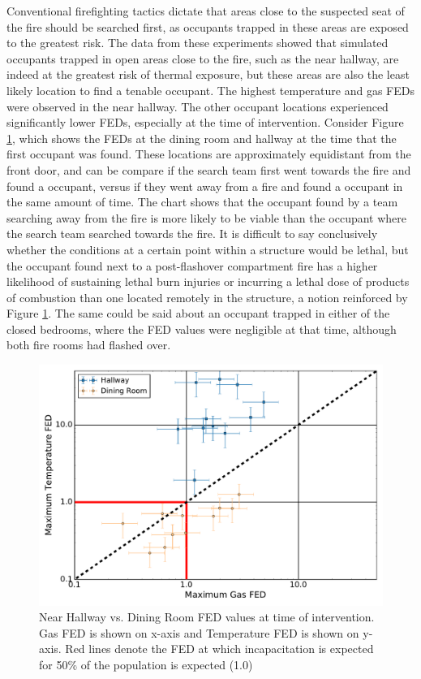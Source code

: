 \documentclass[12pt,oneside]{article}
\begin{document}
Conventional firefighting tactics \cite{Mittendorf,Norman} dictate that areas close to the suspected seat of the fire should be searched first, as occupants trapped in these areas are exposed to the greatest risk. The data from these experiments showed that simulated occupants trapped in open areas close to the fire, such as the near hallway, are indeed at the greatest risk of thermal exposure, but these areas are also the least likely location to find a tenable occupant. The highest temperature and gas FEDs were observed in the near hallway. The other occupant locations experienced significantly lower FEDs, especially at the time of intervention. Consider Figure \ref{fig:open_FED_compare}, which shows the FEDs at the dining room and hallway at the time that the first occupant was found. These locations are approximately equidistant from the front door, and can be compare if the search team first went towards the fire and found a occupant, versus if they went away from a fire and found a occupant in the same amount of time. The chart shows that the occupant found by a team searching away from the fire is more likely to be viable than the occupant where the search team searched towards the fire. It is difficult to say conclusively whether the conditions at a certain point within a structure would be lethal, but the occupant found next to a post-flashover compartment fire has a higher likelihood of sustaining lethal burn injuries or incurring a lethal dose of products of combustion than one located remotely in the structure, a notion reinforced by Figure \ref{fig:open_FED_compare}. The same could be said about an occupant trapped in either of the closed bedrooms, where the FED values were negligible at that time, although both fire rooms had flashed over.  

\begin{figure}[!ht]
	\centering
	\includegraphics[width=.75\textwidth]{../Figures/br_compare/Hall_vic1}
	\caption[Near Hallway vs. Dining Room FED values at time of intervention]{Near Hallway vs. Dining Room FED values at time of intervention. Gas FED is shown on x-axis and Temperature FED is shown on y-axis. Red lines denote the FED at which incapacitation is expected for 50\% of the population is expected (1.0)}
	\label{fig:open_FED_compare}
\end{figure}
\end{document}
